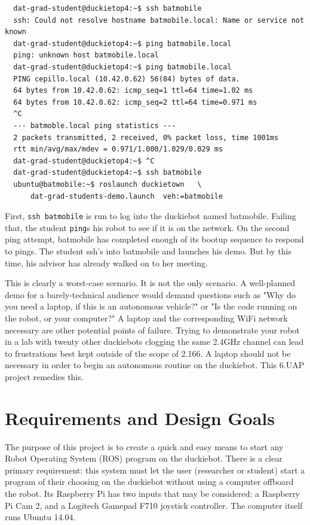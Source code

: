 \documentclass[titlepage]{article}
\begin{document}
\begin{verbatim}
  dat-grad-student@duckietop4:~$ ssh batmobile
  ssh: Could not resolve hostname batmobile.local: Name or service not known
  dat-grad-student@duckietop4:~$ ping batmobile.local
  ping: unknown host batmobile.local
  dat-grad-student@duckietop4:~$ ping batmobile.local
  PING cepillo.local (10.42.0.62) 56(84) bytes of data.
  64 bytes from 10.42.0.62: icmp_seq=1 ttl=64 time=1.02 ms
  64 bytes from 10.42.0.62: icmp_seq=2 ttl=64 time=0.971 ms
  ^C
  --- batmoble.local ping statistics ---
  2 packets transmitted, 2 received, 0% packet loss, time 1001ms
  rtt min/avg/max/mdev = 0.971/1.000/1.029/0.029 ms
  dat-grad-student@duckietop4:~$ ^C
  dat-grad-student@duckietop4:~$ ssh batmobile
  ubuntu@batmobile:~$ roslaunch duckietown   \
      dat-grad-students-demo.launch  veh:=batmobile
 \end{verbatim}

First, \texttt{ssh batmobile} is run to log into the duckiebot named batmobile. Failing that, the student \texttt{ping}s his robot to see if it is on the network. On the second ping attempt, batmobile has completed enough of its bootup sequence to respond to pings. The student ssh's into batmobile and launches his demo. But by this time, his advisor has already walked on to her meeting. 

This is clearly a worst-case scenario. It is not the only scenario.
A well-planned demo for a barely-technical audience would demand questions such as "Why do you need a laptop, if this is an autonomous vehicle?" or "Is the code running on the robot, or your computer?" A laptop and the corresponding WiFi network necessary are other potential points of failure. Trying to demonstrate your robot in a lab with twenty other duckiebots clogging the same 2.4GHz channel can lead to frustrations best kept outside of the scope of 2.166. A laptop should not be necessary in order to begin an autonomous routine on the duckiebot. This 6.UAP project remedies this. 
\section{Requirements and Design Goals}
The purpose of this project is to create a quick and easy means to start any Robot Operating System (ROS) program on the duckiebot. There is a clear primary requirement: this system must let the user (researcher or student) start a program of their choosing on the duckiebot without using a computer offboard the robot. Its Raspberry Pi has two inputs that may be considered: a Raspberry Pi Cam 2, and a Logitech Gamepad F710 joystick controller. The computer itself runs Ubuntu 14.04.
\end{document}
